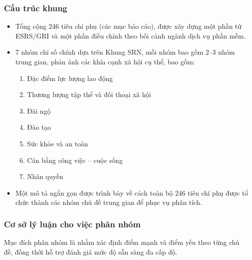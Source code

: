 \subsubsection{Cấu trúc khung}
\begin{itemize}
\item Tổng cộng 246 tiêu chí phụ (các mục báo cáo), được xây dựng một phần từ ESRS/GRI và một phần điều chỉnh theo bối cảnh ngành dịch vụ phần mềm.
\item 7 nhóm chỉ số chính dựa trên Khung SRN, mỗi nhóm bao gồm 2–3 nhóm trung gian, phản ánh các khía cạnh xã hội cụ thể, bao gồm:
\begin{enumerate}
\item Đặc điểm lực lượng lao động
\item Thương lượng tập thể và đối thoại xã hội
\item Đãi ngộ
\item Đào tạo
\item Sức khỏe và an toàn
\item Cân bằng công việc – cuộc sống
\item Nhân quyền
\end{enumerate}
\item Một mô tả ngắn gọn được trình bày về cách toàn bộ 246 tiêu chí phụ được tổ chức thành các nhóm chủ đề trung gian để phục vụ phân tích.
\end{itemize}

\subsubsection{Cơ sở lý luận cho việc phân nhóm}
Mục đích phân nhóm là nhằm xác định điểm mạnh và điểm yếu theo từng chủ đề, đồng thời hỗ trợ đánh giá mức độ sẵn sàng đa cấp độ.

